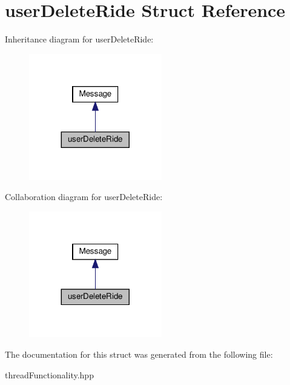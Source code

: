 \hypertarget{structuserDeleteRide}{}\section{user\+Delete\+Ride Struct Reference}
\label{structuserDeleteRide}


Inheritance diagram for user\+Delete\+Ride\+:\nopagebreak
\begin{figure}[H]
\begin{center}
\leavevmode
\includegraphics[width=164pt]{structuserDeleteRide__inherit__graph}
\end{center}
\end{figure}


Collaboration diagram for user\+Delete\+Ride\+:\nopagebreak
\begin{figure}[H]
\begin{center}
\leavevmode
\includegraphics[width=164pt]{structuserDeleteRide__coll__graph}
\end{center}
\end{figure}


The documentation for this struct was generated from the following file\+:\begin{DoxyCompactItemize}
\item 
thread\+Functionality.\+hpp\end{DoxyCompactItemize}

